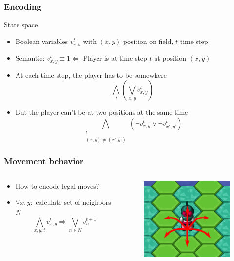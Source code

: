 \begin{frame}
	\frametitle{Encoding}
	\begin{block}{State space}
		\begin{itemize}	
			\item Boolean variables $v_{x,y}^{t}$ with $(x,y)$ position on field, $t$ time step
			\item Semantic: $v_{x,y}^{t} \equiv 1 \Leftrightarrow$ Player is at time step $t$ at position $(x,y)$
		\end{itemize}
	\end{block}

	\pause

	\begin{itemize}
		\item At each time step, the player has to be somewhere
			  \begin{displaymath}
			  \bigwedge \limits_t (\bigvee \limits_{x, y} v_{x,y}^{t})
			  \end{displaymath}
		\pause
		\item But the player can't be at two positions at the same time
			  \begin{displaymath}
			  \bigwedge \limits_{\substack{t\\ {(x, y) \not= (x', y')}}}
			  (\neg v_{x,y}^{t} \vee \neg v_{x',y'}^{t})
			  \end{displaymath}
	\end{itemize}
\end{frame}

\begin{frame}
	\frametitle{Movement behavior}
	\begin{columns}
		\begin{column}{6cm}
			\begin{itemize}
				\item How to encode legal moves?
				\item<2-> $\forall x,y:$ calculate set of neighbors $N$
				\begin{displaymath}
					\bigwedge_{x,y,t} v_{x,y}^t \Rightarrow \bigvee_{n\in N} v_{n}^{t+1}
				\end{displaymath}
			\end{itemize}
		\end{column}
		\begin{column}{5cm}
			\begin{figure}
				\centering
				\includegraphics[width=5cm]{images/movement.png}
			\end{figure}
		\end{column}
	\end{columns}
\end{frame}

